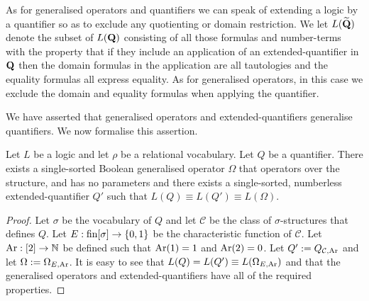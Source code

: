 \documentclass[../main/thesis.tex]{subfiles}
\begin{document}
As for generalised operators and {\lindstrom} quantifiers we can speak of
extending a logic by a quantifier so as to exclude any quotienting or domain
restriction. We let $L (\widetilde{\mathbf{Q}})$ denote the subset of $L(\mathbf{Q})$
consisting of all those formulas and number-terms with the property that if they
include an application of an extended-quantifier in $\mathbf{Q}$ then the domain
formulas in the application are all tautologies and the equality formulas all
express equality. As for generalised operators, in this case we exclude the
domain and equality formulas when applying the quantifier.

We have asserted that generalised operators and extended-quantifiers generalise
{\lindstrom} quantifiers. We now formalise this assertion.

\begin{lem}
  Let $L$ be a logic and let $\rho$ be a relational vocabulary. Let $Q$ be a
  {\lindstrom} quantifier. There exists a single-sorted Boolean generalised
  operator $\Omega$ that operators over the structure, and has no parameters and
  there exists a single-sorted, numberless extended-quantifier $Q'$ such that
  $L(Q) \equiv L(Q') \equiv L(\Omega)$.

\end{lem}

\begin{proof}

  Let $\sigma$ be the vocabulary of $Q$ and let $\mathcal{C}$ be the class of
  $\sigma$-structures that defines $Q$. Let $E : \text{\upshape fin}{[\sigma]} \rightarrow \{0,1\}$ be
  the characteristic function of $\mathcal{C}$. Let $\text{\upshape Ar}: [2] \rightarrow \mathbb{N}$ be
  defined such that $\text{\upshape Ar} (1) = 1$ and $\text{\upshape Ar} (2) = 0$. Let $Q' := Q_{\mathcal{C},
    \text{\upshape Ar}}$ and let $\Omega:= \Omega_{E, \text{\upshape Ar}}$. It is easy to see that $L(Q) =
  L(Q') \equiv L(\Omega_{E, \text{\upshape Ar}})$ and that the generalised operators and
  extended-quantifiers have all of the required properties.
\end{proof}

\end{document}
